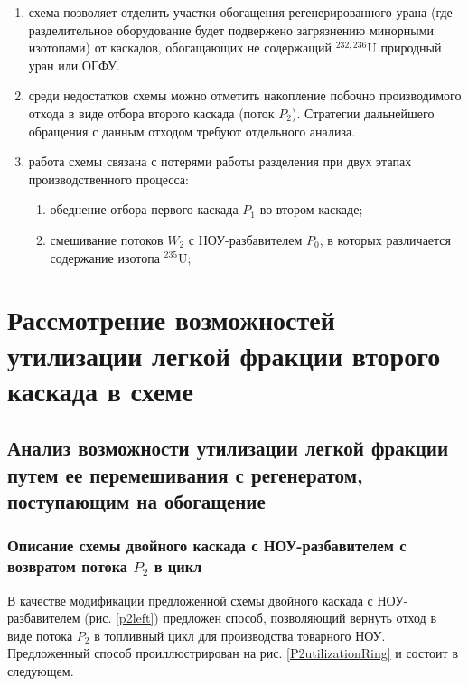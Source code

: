 \begin{enumerate}
    \item схема позволяет отделить участки обогащения регенерированного урана (где разделительное оборудование будет подвержено загрязнению минорными изотопами) от каскадов, обогащающих не содержащий $^{232,236}$U природный уран или ОГФУ. 
     \item среди недостатков схемы можно отметить накопление побочно производимого отхода в виде отбора второго каскада (поток $P_2$). Стратегии дальнейшего обращения с данным отходом требуют отдельного анализа.
    \item работа схемы связана с потерями работы разделения при двух этапах производственного процесса:
    \begin{enumerate}
        \item обеднение отбора первого каскада $P_1$ во втором каскаде;
        \item смешивание потоков $W_2$ с НОУ-разбавителем $P_0$, в которых различается содержание изотопа $^{235}$U;
    \end{enumerate}
\end{enumerate}


\section{Рассмотрение возможностей утилизации легкой фракции второго каскада в схеме}

\subsection{Анализ возможности утилизации легкой фракции путем ее перемешивания с регенератом, поступающим на обогащение}

\subsubsection{Описание схемы двойного каскада с НОУ-разбавителем с возвратом потока $P_2$ в цикл}

В качестве модификации предложенной схемы двойного каскада с НОУ-разбавителем (рис. \ref{p2left}) предложен способ, позволяющий вернуть отход в виде потока $P_2$ в топливный цикл для производства товарного НОУ. Предложенный способ проиллюстрирован на рис. \ref{P2utilizationRing} и состоит в следующем.

